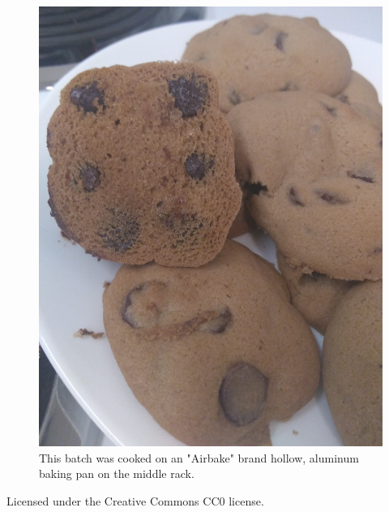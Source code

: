 \documentclass[12pt, letterpaper]{article}
\begin{document}
\begin{flushleft}


\begin{figure}[H]
\begin{center}
\includegraphics[width=0.6\linewidth]{./pics/cookies.jpg}
\caption{This batch was cooked on an "Airbake" brand hollow, aluminum baking pan on the middle rack.}
\end{center}
\end{figure}

Licensed under the Creative Commons CC0 license.

\end{flushleft}
\end{document}
